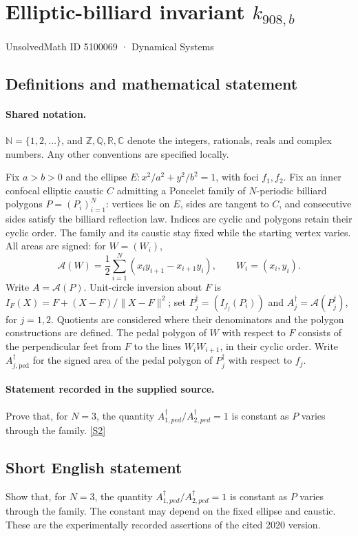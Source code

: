 \documentclass[11pt]{article}
\newcommand{\sref}[2]{\hyperlink{source:#1:#2}{[S#2]}}
\begin{document}
\setcounter{section}{5100068}
\section{Elliptic-billiard invariant $k_{908,b}$}\label{5100069}
{\small\sffamily UnsolvedMath ID 5100069 · Dynamical Systems}
\subsection{Definitions and mathematical statement}

\paragraph{Shared notation.}$\mathbb N=\{1,2,\ldots\}$, and $\mathbb Z,\mathbb Q,\mathbb R,\mathbb C$ denote the integers, rationals, reals and complex numbers. Any other conventions are specified locally.


Fix $a>b>0$ and the ellipse $E:x^2/a^2+y^2/b^2=1$, with foci $f_1,f_2$. Fix an inner confocal elliptic caustic $C$ admitting a Poncelet family of $N$-periodic billiard polygons $P=(P_i)_{i=1}^N$: vertices lie on $E$, sides are tangent to $C$, and consecutive sides satisfy the billiard reflection law. Indices are cyclic and polygons retain their cyclic order. The family and its caustic stay fixed while the starting vertex varies. All areas are signed: for $W=(W_i)$,
\[\mathcal A(W)=\frac12\sum_{i=1}^N(x_i y_{i+1}-x_{i+1}y_i),\qquad W_i=(x_i,y_i).\]
Write $A=\mathcal A(P)$. Unit-circle inversion about $F$ is $I_F(X)=F+(X-F)/\lVert X-F\rVert^2$; set $P_j^\dagger=(I_{f_j}(P_i))$ and $A_j^\dagger=\mathcal A(P_j^\dagger)$, for $j=1,2$. Quotients are considered where their denominators and the polygon constructions are defined. The pedal polygon of $W$ with respect to $F$ consists of the perpendicular feet from $F$ to the lines $W_iW_{i+1}$, in their cyclic order. Write $A_{j,\mathrm{ped}}^\dagger$ for the signed area of the pedal polygon of $P_j^\dagger$ with respect to $f_j$.
\paragraph{Statement recorded in the supplied source.}
Prove that, for $N=3$, the quantity $A_{1,ped}^\dagger/A_{2,ped}^\dagger=1$ is constant as $P$ varies through the family. \sref{5100069}{2}
\subsection{Short English statement}
Show that, for $N=3$, the quantity $A_{1,ped}^\dagger/A_{2,ped}^\dagger=1$ is constant as $P$ varies through the family. The constant may depend on the fixed ellipse and caustic. These are the experimentally recorded assertions of the cited 2020 version.
\end{document}
